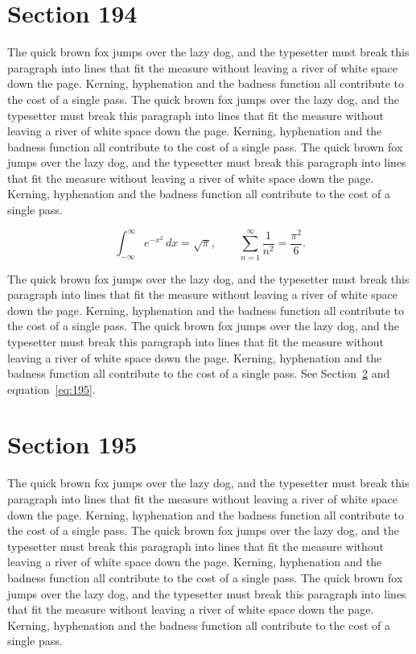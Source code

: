 \documentclass{article}
\begin{document}
\section{Section 194}
\label{sec:194}
The quick brown fox jumps over the lazy dog, and the typesetter must break this paragraph into lines that fit the measure without leaving a river of white space down the page. Kerning, hyphenation and the badness function all contribute to the cost of a single pass. The quick brown fox jumps over the lazy dog, and the typesetter must break this paragraph into lines that fit the measure without leaving a river of white space down the page. Kerning, hyphenation and the badness function all contribute to the cost of a single pass. The quick brown fox jumps over the lazy dog, and the typesetter must break this paragraph into lines that fit the measure without leaving a river of white space down the page. Kerning, hyphenation and the badness function all contribute to the cost of a single pass. 

\begin{equation}\label{eq:194}
\int_{-\infty}^{\infty} e^{-x^{2}}\,dx = \sqrt{\pi}, \qquad
\sum_{n=1}^{\infty} \frac{1}{n^{2}} = \frac{\pi^{2}}{6}.
\end{equation}

The quick brown fox jumps over the lazy dog, and the typesetter must break this paragraph into lines that fit the measure without leaving a river of white space down the page. Kerning, hyphenation and the badness function all contribute to the cost of a single pass. The quick brown fox jumps over the lazy dog, and the typesetter must break this paragraph into lines that fit the measure without leaving a river of white space down the page. Kerning, hyphenation and the badness function all contribute to the cost of a single pass. 
See Section~\ref{sec:195} and equation~\eqref{eq:195}.
\section{Section 195}
\label{sec:195}
The quick brown fox jumps over the lazy dog, and the typesetter must break this paragraph into lines that fit the measure without leaving a river of white space down the page. Kerning, hyphenation and the badness function all contribute to the cost of a single pass. The quick brown fox jumps over the lazy dog, and the typesetter must break this paragraph into lines that fit the measure without leaving a river of white space down the page. Kerning, hyphenation and the badness function all contribute to the cost of a single pass. The quick brown fox jumps over the lazy dog, and the typesetter must break this paragraph into lines that fit the measure without leaving a river of white space down the page. Kerning, hyphenation and the badness function all contribute to the cost of a single pass. 
\end{document}
